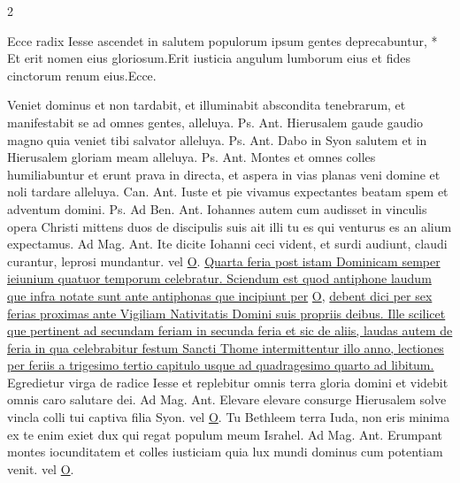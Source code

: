 \begin{multicols*}{2}
\begin{responsory-doxology}
{Ecce radix Iesse ascendet in salutem populorum ipsum gentes deprecabuntur, * Et erit nomen eius gloriosum.}{Erit iusticia angulum lumborum eius et fides cinctorum renum eius.}Ecce.
\end{responsory-doxology}%
 Veniet dominus et non tardabit, et illuminabit abscondita tenebrarum, et manifestabit se ad omnes gentes, alleluya. {\color{Red} Ps.}  {\color{Red} Ant.} Hierusalem gaude gaudio magno quia veniet tibi salvator alleluya. {\color{Red} Ps.}  {\color{Red} Ant.} Dabo in Syon salutem et in Hierusalem gloriam meam alleluya. {\color{Red} Ps.}  {\color{Red} Ant.} Montes et omnes colles humiliabuntur et erunt prava in directa, et aspera in vias planas veni domine et noli tardare alleluya. {\color{Red} Can.}  {\color{Red} Ant.} Iuste et pie vivamus expectantes beatam spem et adventum domini. {\color{Red} Ps.}  {\color{Red} Ad Ben. Ant.} Iohannes autem cum audisset in vinculis opera Christi mittens duos de discipulis suis ait illi tu es qui venturus es an alium expectamus. {\color{Red} Ad Mag. Ant.} Ite dicite Iohanni ceci vident, et surdi audiunt, claudi curantur, leprosi mundantur. {\color{Red} vel} \hyperlink{o-antiphons}{O}.
\newline \ul{Quarta feria post istam Dominicam semper ieiunium quatuor temporum celebratur. Sciendum est quod antiphone laudum que infra notate sunt ante antiphonas que incipiunt per} \hyperlink{o-antiphons}{O}, \ul{debent dici per sex ferias proximas ante Vigiliam Nativitatis Domini suis propriis deibus. Ille scilicet que pertinent ad secundam feriam in secunda feria et sic de aliis, laudas autem de feria in qua celebrabitur festum Sancti Thome intermittentur illo anno, lectiones per feriis a trigesimo tertio capitulo usque ad quadragesimo quarto ad libitum.}
 Egredietur virga de radice Iesse et replebitur omnis terra gloria domini et videbit omnis caro salutare dei. {\color{Red} Ad Mag. Ant. } Elevare elevare consurge Hierusalem solve vincla colli tui captiva filia Syon. {\color{Red} vel} \hyperlink{o-antiphons}{O}.
 Tu Bethleem terra Iuda, non eris minima ex te enim exiet dux qui regat populum meum Israhel. {\color{Red} Ad Mag. Ant.} Erumpant montes iocunditatem et colles iusticiam quia lux mundi dominus cum potentiam venit. {\color{Red} vel} \hyperlink{o-antiphons}{O}.

\end{multicols*}
